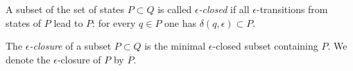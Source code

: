 

\setcounter{section}{1}
\setcounter{subsection}{4}
\setcounter{dfn}{13}

\begin{dfn}
A subset of the set of states $P \subset Q$ is called \emph{$\epsilon$-closed}
if all $\epsilon$-transitions from states of $P$ lead to $P$: for every $q \in P$ one has $\delta(q, \epsilon) \subset P$.

The \emph{$\epsilon$-closure} of a subset $P \subset Q$ is the minimal $\epsilon$-closed subset containing $P$.
We denote the $\epsilon$-closure of $P$ by $\overline{P}$.
\end{dfn}


